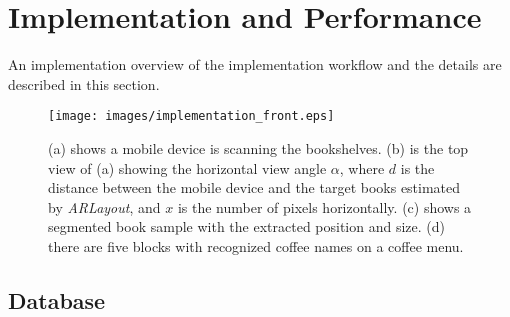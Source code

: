 \section{Implementation and Performance}
\label{sec:implementation}

An implementation overview of the implementation workflow
and the details are described in this section.


\begin{figure}[htp]
    \texttt{[image: images/implementation\_front.eps]}
    \caption{
        (a) shows a mobile device is scanning the bookshelves.
        (b) is the top view of (a) showing the horizontal view angle $\alpha$,
        where $d$ is the distance between the mobile device and the target books estimated by \textit{ARLayout},
        and $x$ is the number of pixels horizontally.
        (c) shows a segmented book sample with the extracted position and size. %
        (d) there are five blocks with recognized coffee names on a coffee menu.
    }
    \label{fig:implementation_front}
\end{figure}




%


\subsection{Database}

